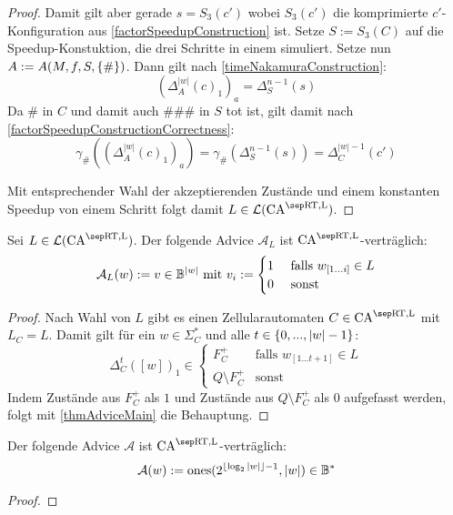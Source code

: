\begin{proof}
    Damit gilt aber gerade $s = S_3(c')$ wobei $S_3(c')$ die komprimierte $c'$-Konfiguration aus \cref{factorSpeedupConstruction} ist.
    Setze $S := S_3(C)$ auf die Speedup-Konstuktion, die drei Schritte in einem simuliert. Setze nun $A := A(M, f, S, \{ {\#} \})$.
    Dann gilt nach \cref{timeNakamuraConstruction}:
    \[
        (\Delta^{ |w| }_A(c)_1)_a = \Delta_S^{n - 1}(s)
    \]
    Da $\#$ in $C$ und damit auch $\#\#\#$ in $S$ tot ist, gilt damit nach \cref{factorSpeedupConstructionCorrectness}:
    \[
        \gamma_\#((\Delta^{ |w| }_A(c)_1)_a) = \gamma_\#(\Delta_S^{n-1}(s)) = \Delta_C^{|w| - 1}(c')
    \]
    
    Mit entsprechender Wahl der akzeptierenden Zustände und einem konstanten Speedup von einem Schritt
    folgt damit $L \in \CAL{\CART, \CALeft}$.
\end{proof}

\begin{corollary}
    Sei $L \in \CAL{\CART, \CALeft}$.
    Der folgende Advice $\mathcal{A}_L$ ist $\CAM{\CART, \CALeft}$-verträglich:
    \[
        \mathcal{A}_L(w) := v \in \mathbb{B}^{|w|} \text{ mit } v_i :=
        \begin{cases}
            1 & \text{ falls } w_{[1...i]} \in L \\
            0 & \text{ sonst }
        \end{cases}
    \]
\end{corollary}
\begin{proof}
    Nach Wahl von $L$ gibt es einen Zellularautomaten $C \in \CAM{\CART, \CALeft}$
    mit $L_C = L$. Damit gilt für ein $w \in \Sigma_C^*$ und alle $t \in \{ {0, ..., |w|-1} \}$:
    \[
        \Delta_C^{t}([w])_1 \in
        \begin{cases}
            F_C^+ & \text{falls } w_{[1...t+1]} \in L \\
            Q \setminus F_C^+ & \text {sonst}
        \end{cases}
    \]
    Indem Zustände aus $F_C^+$ als $1$ und Zustände aus $Q \setminus F_C^+$ als $0$ aufgefasst werden, 
    folgt mit \cref{thmAdviceMain} die Behauptung.
\end{proof}


\begin{satz}
    Der folgende Advice $\mathcal{A}$ ist $\CAM{\CART, \CALeft}$-verträglich:
    \[
        \mathcal{A}(w) := \mathrm{ones}(2^{\lfloor \log_2{|w|} \rfloor - 1}, |w|) \in \mathbb{B}^*
    \]
\end{satz}
\begin{proof}
    
\end{proof}

